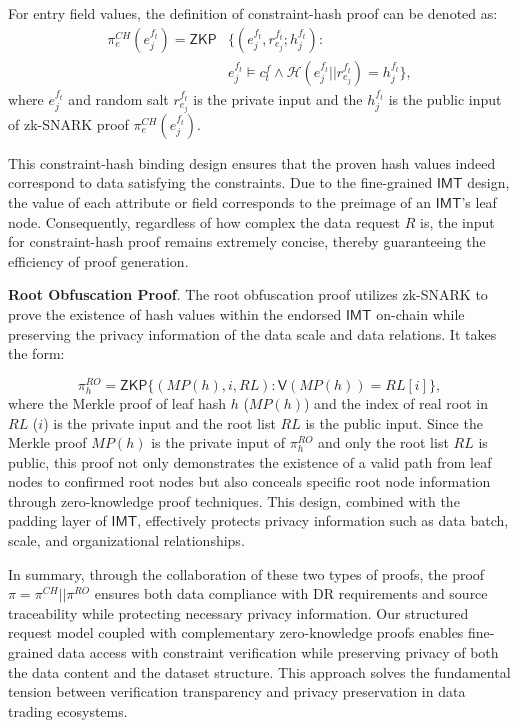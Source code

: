 \documentclass[journal]{IEEEtran}
\begin{document}
For entry field values, the definition of constraint-hash proof can be denoted as:
\begin{equation}
\begin{aligned}
        \pi_{e}^{CH}(e_j^{f_t}) = \mathsf{ZKP} & \bigg\{(e_j^{f_t}, r_{e_j}^{f_t}; h_j^{f_t}) : \\ 
        & e_j^{f_t} \models c_t^f \land \mathcal{H}(e_j^{f_t} || r_{e_j}^{f_t}) = h_j^{f_t}\bigg\},
\end{aligned}
\label{eq:proof_che}
\end{equation}
where $e_j^{f_t}$ and random salt $r_{e_j}^{f_t}$ is the private input and the $h_j^{f_t}$ is the public input of zk-SNARK proof $\pi_{e}^{CH}(e_j^{f_t})$.

This constraint-hash binding design ensures that the proven hash values indeed correspond to data satisfying the constraints. Due to the fine-grained $\mathsf{IMT}$ design, the value of each attribute or field corresponds to the preimage of an $\mathsf{IMT}$'s leaf node. Consequently, regardless of how complex the data request $R$ is, the input for constraint-hash proof remains extremely concise, thereby guaranteeing the efficiency of proof generation.

\textbf{Root Obfuscation Proof}. The root obfuscation proof utilizes zk-SNARK to prove the existence of hash values within the endorsed $\mathsf{IMT}$ on-chain while preserving the privacy information of the data scale and data relations. It takes the form:

\begin{equation}
    \pi_{h}^{RO} = \mathsf{ZKP}\{(MP(h), i, RL) : \mathsf{V}(MP(h)) = RL[i]\},
\end{equation}
where the Merkle proof of leaf hash $h$ ($MP(h)$) and the index of real root in $RL$ ($i$) is the private input and the root list $RL$ is the public input. Since the Merkle proof $MP(h)$ is the private input of $\pi_{h}^{RO}$ and only the root list $RL$ is public, this proof not only demonstrates the existence of a valid path from leaf nodes to confirmed root nodes but also conceals specific root node information through zero-knowledge proof techniques. This design, combined with the padding layer of $\mathsf{IMT}$, effectively protects privacy information such as data batch, scale, and organizational relationships.

In summary, through the collaboration of these two types of proofs, the proof $\pi = \pi^{CH} || \pi^{RO}$ ensures both data compliance with DR requirements and source traceability while protecting necessary privacy information. Our structured request model coupled with complementary zero-knowledge proofs enables fine-grained data access with constraint verification while preserving privacy of both the data content and the dataset structure. This approach solves the fundamental tension between verification transparency and privacy preservation in data trading ecosystems.
\end{document}
